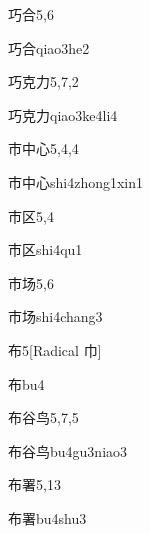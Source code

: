 \begin{entry}{巧合}{5,6}
  \begin{phonetics}{巧合}{qiao3he2}
  \end{phonetics}
\end{entry}

\begin{entry}{巧克力}{5,7,2}
  \begin{phonetics}{巧克力}{qiao3ke4li4}
  \end{phonetics}
\end{entry}

\begin{entry}{市中心}{5,4,4}
  \begin{phonetics}{市中心}{shi4zhong1xin1}
  \end{phonetics}
\end{entry}

\begin{entry}{市区}{5,4}
  \begin{phonetics}{市区}{shi4qu1}
  \end{phonetics}
\end{entry}

\begin{entry}{市场}{5,6}
  \begin{phonetics}{市场}{shi4chang3}
  \end{phonetics}
\end{entry}

\begin{entry}{布}{5}[Radical 巾]
  \begin{phonetics}{布}{bu4}
  \end{phonetics}
\end{entry}

\begin{entry}{布谷鸟}{5,7,5}
  \begin{phonetics}{布谷鸟}{bu4gu3niao3}
  \end{phonetics}
\end{entry}

\begin{entry}{布署}{5,13}
  \begin{phonetics}{布署}{bu4shu3}
  \end{phonetics}
\end{entry}

